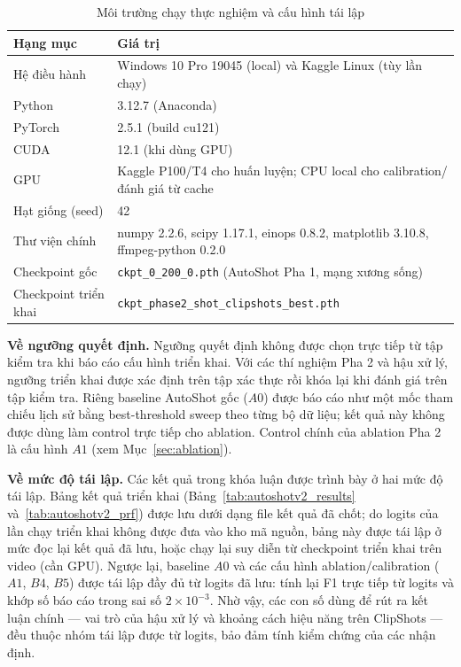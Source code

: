 \begin{table}[H]
\centering
\caption{Môi trường chạy thực nghiệm và cấu hình tái lập}
\label{tab:env_config}
\small
\begin{tabular}{lL{9cm}}
\toprule
\textbf{Hạng mục} & \textbf{Giá trị} \\
\midrule
Hệ điều hành & Windows 10 Pro 19045 (local) và Kaggle Linux (tùy lần chạy) \\
Python & 3.12.7 (Anaconda) \\
PyTorch & 2.5.1 (build cu121) \\
CUDA & 12.1 (khi dùng GPU) \\
GPU & Kaggle P100/T4 cho huấn luyện; CPU local cho calibration/đánh giá từ cache \\
Hạt giống (seed) & 42 \\
Thư viện chính & numpy 2.2.6, scipy 1.17.1, einops 0.8.2, matplotlib 3.10.8, ffmpeg-python 0.2.0 \\
Checkpoint gốc & \texttt{ckpt\_0\_200\_0.pth} (AutoShot Pha 1, mạng xương sống) \\
Checkpoint triển khai & \texttt{ckpt\_phase2\_shot\_clipshots\_best.pth} \\
\bottomrule
\end{tabular}
\end{table}

\textbf{Về ngưỡng quyết định.} Ngưỡng quyết định không được chọn trực tiếp từ tập kiểm tra khi báo cáo cấu hình triển khai. Với các thí nghiệm Pha 2 và hậu xử lý, ngưỡng triển khai được xác định trên tập xác thực rồi khóa lại khi đánh giá trên tập kiểm tra. Riêng baseline AutoShot gốc ($A0$) được báo cáo như một mốc tham chiếu lịch sử bằng best-threshold sweep theo từng bộ dữ liệu; kết quả này không được dùng làm control trực tiếp cho ablation. Control chính của ablation Pha 2 là cấu hình $A1$ (xem Mục~\ref{sec:ablation}).

\textbf{Về mức độ tái lập.} Các kết quả trong khóa luận được trình bày ở hai mức độ tái lập. Bảng kết quả triển khai (Bảng~\ref{tab:autoshotv2_results} và~\ref{tab:autoshotv2_prf}) được lưu dưới dạng file kết quả đã chốt; do logits của lần chạy triển khai không được đưa vào kho mã nguồn, bảng này được tái lập ở mức đọc lại kết quả đã lưu, hoặc chạy lại suy diễn từ checkpoint triển khai trên video (cần GPU). Ngược lại, baseline $A0$ và các cấu hình ablation/calibration ($A1$, $B4$, $B5$) được tái lập đầy đủ từ logits đã lưu: tính lại F1 trực tiếp từ logits và khớp số báo cáo trong sai số $2\times10^{-3}$. Nhờ vậy, các con số dùng để rút ra kết luận chính --- vai trò của hậu xử lý và khoảng cách hiệu năng trên ClipShots --- đều thuộc nhóm tái lập được từ logits, bảo đảm tính kiểm chứng của các nhận định.


